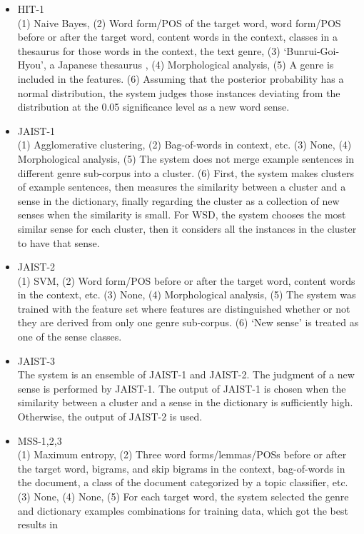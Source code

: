 \documentclass[english]{jnlp_1.4}
\begin{document}
\begin{itemize}
\item HIT-1\\
(1) Naive Bayes, (2) Word form/POS of the target word, word form/POS before or
after the target word, content words in the context, classes in a
thesaurus for those words in the context, the text genre,
(3) `Bunrui-Goi-Hyou', a Japanese thesaurus \cite{NIJL:64:a},
(4) Morphological analysis, (5) A genre is included in the
features. (6) Assuming that the posterior probability has a normal distribution, 
the system judges those instances deviating from the distribution at
the 0.05 significance level as a new word sense.
\item JAIST-1\\
(1) Agglomerative clustering, (2) Bag-of-words in context, etc. (3) None,
(4) Morphological analysis, (5) The system does not merge example sentences
in different genre sub-corpus into a cluster. (6) First, the system makes
clusters of example sentences, then measures the similarity between a
cluster and a sense in the dictionary, finally regarding the cluster as a
collection of new senses when the similarity is small. For WSD, the
system chooses the most similar sense for each cluster, then it
considers all the instances in the cluster to have that sense.
\item JAIST-2\\
(1) SVM, (2) Word form/POS before or after the target word, content words in
the context, etc. (3) None, (4) Morphological analysis, (5) The system was
trained with the feature set where features are distinguished whether
or not they are derived from only one genre sub-corpus. (6) `New sense'
is treated as one of the sense classes.
\item JAIST-3\\
The system is an ensemble of JAIST-1 and JAIST-2. The judgment of a new
sense is performed by JAIST-1. The output of JAIST-1 is chosen when the
similarity between a cluster and a sense in the dictionary is
sufficiently high. Otherwise, the output of JAIST-2 is used.
\item MSS-1,2,3\\
(1) Maximum entropy, (2) Three word forms/lemmas/POSs
  before or after the target word, bigrams, and skip bigrams in the
  context, bag-of-words in the document, a class of the document
  categorized by a topic classifier, etc. (3) None, (4) None, (5) For each
  target word, the system selected the genre and dictionary examples
  combinations for training data, which got the best results in

\end{itemize}
\end{document}
